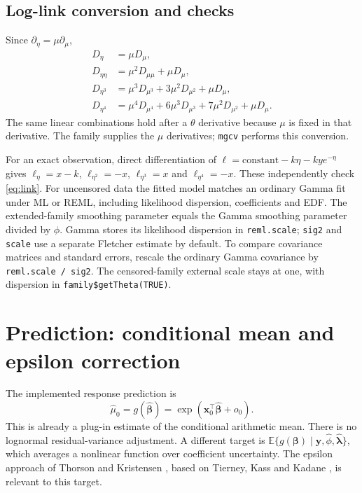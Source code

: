\documentclass[11pt,a4paper]{article}
\newcommand{\E}{\mathbb{E}}
\newcommand{\code}[1]{\texttt{#1}}
\begin{document}
\subsection{Log-link conversion and checks}
Since $\partial_\eta=\mu\partial_\mu$,
\begin{align}
 D_\eta&=\mu D_\mu,\\
 D_{\eta\eta}&=\mu^2D_{\mu\mu}+\mu D_\mu,\\
 D_{\eta^3}&=\mu^3D_{\mu^3}+3\mu^2D_{\mu^2}+\mu D_\mu,\\
 D_{\eta^4}&=\mu^4D_{\mu^4}+6\mu^3D_{\mu^3}+7\mu^2D_{\mu^2}+\mu D_\mu.
 \label{eq:link}
\end{align}
The same linear combinations hold after a $\theta$ derivative because
$\mu$ is fixed in that derivative. The family supplies the $\mu$ derivatives;
\code{mgcv} performs this conversion.

For an exact observation, direct differentiation of
$\ell=\text{constant}-k\eta-ky e^{-\eta}$ gives
$\ell_\eta=x-k$, $\ell_{\eta^2}=-x$, $\ell_{\eta^3}=x$ and
$\ell_{\eta^4}=-x$. These independently check \eqref{eq:link}.
For uncensored data the fitted model matches an ordinary Gamma fit under
ML or REML, including likelihood dispersion, coefficients and EDF. The
extended-family smoothing parameter equals the Gamma smoothing parameter
divided by $\phi$. Gamma stores its likelihood dispersion in
\code{reml.scale}; \code{sig2} and \code{scale} use a separate Fletcher
estimate by default. To compare covariance matrices and standard errors,
rescale the ordinary Gamma covariance by \code{reml.scale / sig2}.
The censored-family external scale stays at one, with dispersion in
\code{family\$getTheta(TRUE)}.

\newpage
\section{Prediction: conditional mean and epsilon correction}
\label{sec:prediction}
The implemented response prediction is
\[
 \widehat\mu_0=g(\widehat{\bm\beta})
  =\exp(\bm x_0^\top\widehat{\bm\beta}+o_0).
\]
This is already a plug-in estimate of the conditional arithmetic mean.
There is no lognormal residual-variance adjustment. A different target is
$\E\{g(\bm\beta)\mid\bm y,\widehat\phi,\widehat{\bm\lambda}\}$,
which averages a nonlinear function over coefficient uncertainty.
The epsilon approach of Thorson and Kristensen \cite{tk}, based on Tierney,
Kass and Kadane \cite{tierney}, is relevant to this target.
\end{document}
